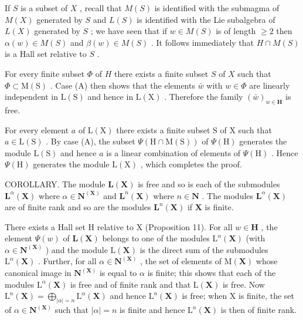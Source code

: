 If \(S\) is a subset of \(X\) , recall that \(M(S)\) is identified with the submagma of \(M(X)\) generated by \(S\) and \(L(S)\) is identified with the Lie subalgebra of \(L(X)\) generated by \(S\) ; we have seen that if \(w \in M(S)\) is of length \(\geqslant 2\) then \(\alpha(w) \in M(S)\) and \(\beta(w) \in M(S)\) . It follows immediately that \(H \cap M(S)\) is a Hall set relative to \(S\) .

For every finite subset \(\Phi\) of \(H\) there exists a finite subset \(S\) of \(X\) such that \(\Phi \subset \mathrm{M}(\mathrm{S})\) . Case (A) then shows that the elements \(\bar{w}\) with \(w \in \Phi\) are linearly independent in \(\mathrm{L}(\mathrm{S})\) and hence in \(\mathrm{L}(\mathrm{X})\) . Therefore the family \((\bar{w})_{w \in \mathbf{H}}\) is free.

For every element \(a\) of \(\mathrm{L}(\mathrm{X})\) there exists a finite subset \(\mathrm{S}\) of \(\mathrm{X}\) such that \(a \in \mathrm{L}(\mathrm{S})\) . By case (A), the subset \(\Psi(\mathrm{H} \cap \mathrm{M}(\mathrm{S}))\) of \(\Psi(\mathrm{H})\) generates the module \(\mathrm{L}(\mathrm{S})\) and hence \(a\) is a linear combination of elements of \(\Psi(\mathrm{H})\) . Hence \(\Psi(\mathrm{H})\) generates the module \(\mathrm{L}(\mathrm{X})\) , which completes the proof.

COROLLARY. The module \(\mathbf{L}(\mathbf{X})\) is free and so is each of the submodules \(\mathbf{L}^{\alpha}(\mathbf{X})\) where \(\alpha \in \mathbf{N}^{(\mathbf{X})}\) and \(\mathbf{L}^n (\mathbf{X})\) where \(n\in \mathbf{N}\) . The modules \(\mathbf{L}^{\alpha}(\mathbf{X})\) are of finite rank and so are the modules \(\mathbf{L}^n (\mathbf{X})\) if \(\mathbf{X}\) is finite.

There exists a Hall set H relative to X (Proposition 11). For all \(w \in \mathbf{H}\) , the element \(\Psi(w)\) of \(\mathbf{L}(\mathbf{X})\) belongs to one of the modules \(\mathrm{L}^{\alpha}(\mathbf{X})\) (with \(\alpha \in \mathbf{N}^{(\mathbf{X})}\) ) and the module \(\mathrm{L}(\mathbf{X})\) is the direct sum of the submodules \(\mathrm{L}^{\alpha}(\mathbf{X})\) . Further, for all \(\alpha \in \mathbf{N}^{(\mathbf{X})}\) , the set of elements of \(\mathrm{M}(\mathbf{X})\) whose canonical image in \(\mathbf{N}^{(\mathbf{X})}\) is equal to \(\alpha\) is finite; this shows that each of the modules \(\mathrm{L}^{\alpha}(\mathbf{X})\) is free and of finite rank and that \(\mathrm{L}(\mathbf{X})\) is free. Now \(\mathrm{L}^{n}(\mathbf{X}) = \bigoplus_{|\alpha| = n} \mathrm{L}^{\alpha}(\mathbf{X})\) and hence \(\mathrm{L}^{n}(\mathbf{X})\) is free; when X is finite, the set of \(\alpha \in \mathbf{N}^{(\mathbf{X})}\) such that \(|\alpha| = n\) is finite and hence \(\mathrm{L}^{n}(\mathbf{X})\) is then of finite rank.

